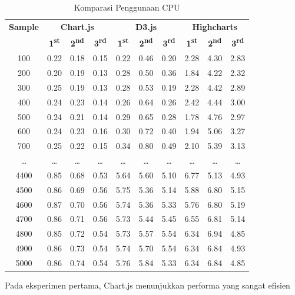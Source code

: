\begin{table}[H]
	\centering
	\caption{Komparasi Penggunaan CPU}
	\begin{tabular}{|c|ccc|ccc|ccc|}
		\hline
		\textbf{Sample} & \multicolumn{3}{c|}{\textbf{Chart.js}} & \multicolumn{3}{c|}{\textbf{D3.js}} & \multicolumn{3}{c|}{\textbf{Highcharts}} \\
		& \textbf{1\textsuperscript{st}} & \textbf{2\textsuperscript{nd}} & \textbf{3\textsuperscript{rd}} & \textbf{1\textsuperscript{st}} & \textbf{2\textsuperscript{nd}} & \textbf{3\textsuperscript{rd}} & \textbf{1\textsuperscript{st}} & \textbf{2\textsuperscript{nd}} & \textbf{3\textsuperscript{rd}} \\
		\hline
		100  & 0.22 & 0.18 & 0.15 & 0.22 & 0.46 & 0.20 & 2.28 & 4.30 & 2.83 \\
		200  & 0.20 & 0.19 & 0.13 & 0.28 & 0.50 & 0.36 & 1.84 & 4.22 & 2.32 \\
		300  & 0.25 & 0.19 & 0.13 & 0.28 & 0.53 & 0.19 & 2.28 & 4.42 & 2.89 \\
		400  & 0.24 & 0.23 & 0.14 & 0.26 & 0.64 & 0.26 & 2.42 & 4.44 & 3.00 \\
		500  & 0.24 & 0.21 & 0.14 & 0.29 & 0.65 & 0.28 & 1.78 & 4.76 & 2.97 \\
		600  & 0.24 & 0.23 & 0.16 & 0.30 & 0.72 & 0.40 & 1.94 & 5.06 & 3.27 \\
		700  & 0.25 & 0.22 & 0.15 & 0.34 & 0.80 & 0.49 & 2.10 & 5.39 & 3.13 \\
		\ldots & \ldots & \ldots & \ldots & \ldots & \ldots & \ldots & \ldots & \ldots & \ldots \\
		4400 & 0.85 & 0.68 & 0.53 & 5.64 & 5.60 & 5.10 & 6.77 & 5.13 & 4.93 \\
		4500 & 0.86 & 0.69 & 0.56 & 5.75 & 5.36 & 5.14 & 5.88 & 6.80 & 5.15 \\
		4600 & 0.87 & 0.70 & 0.56 & 5.74 & 5.36 & 5.33 & 5.76 & 6.80 & 5.19 \\
		4700 & 0.86 & 0.71 & 0.56 & 5.73 & 5.44 & 5.45 & 6.55 & 6.81 & 5.14 \\
		4800 & 0.85 & 0.72 & 0.54 & 5.73 & 5.57 & 5.54 & 6.34 & 6.94 & 4.85 \\
		4900 & 0.86 & 0.73 & 0.54 & 5.74 & 5.70 & 5.54 & 6.34 & 6.84 & 4.93 \\
		5000 & 0.86 & 0.74 & 0.54 & 5.76 & 5.84 & 5.33 & 6.34 & 6.84 & 4.85 \\
		\hline
	\end{tabular}
\end{table}
Pada eksperimen pertama, Chart.js menunjukkan performa yang sangat efisien
